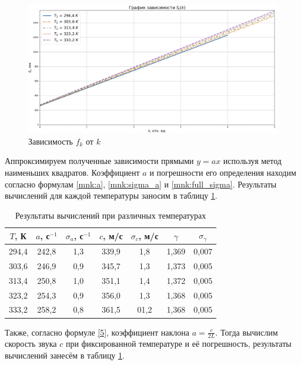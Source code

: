 \documentclass[a4paper,12pt]{article}
\theoremstyle{definition}
\begin{document}
	\begin{figure}[h!]
		\centering
		\includegraphics[scale=0.542]{graph2}
		\caption{Зависимость $ f_k $ от $ k $}
		\label{graph}
	\end{figure}

	Аппроксимируем полученные зависимости прямыми $ y=ax $ используя метод наименьших квадратов. Коэффициент $ a $ и погрешности его определения находим согласно формулам \eqref{mnk:a}, \eqref{mnk:sigma_a} и \eqref{mnk:full_sigma}. Результаты вычислений для каждой температуры заносим в таблицу \ref{tab:resConstL}.
	
	\begin{table}[H]
		\centering
		\begin{tabular}{|c|c|c|c|c|c|c|}
			\hline
			$ T $, К & $ a $, с$ ^{-1} $ & $ \sigma_a $, с$ ^{-1} $ & $ c $, м/с & $ \sigma_c $, м/с & $ \gamma $ & $ \sigma_\gamma $ \\ \hline
			294,4 & 242,8 & 1,3 & 339,9 & 1,8 & 1,369 & 0,007 \\ \hline
			303,6 & 246,9 & 0,9 & 345,7 & 1,3 & 1,373 & 0,005 \\ \hline
			313,4 & 250,8 & 1,0 & 351,1 & 1,4 & 1,372 & 0,005 \\ \hline
			323,2 & 254,3 & 0,9 & 356,0 & 1,3 & 1,368 & 0,005 \\ \hline
			333,2 & 258,2 & 0,8 & 361,5 & 01,2 & 1,368 & 0,005 \\ \hline
		\end{tabular}
		\caption{Результаты вычислений при различных температурах}
		\label{tab:resConstL}
	\end{table}
	
	Также, согласно формуле \eqref{5}, коэффициент наклона $ \displaystyle a = \frac{c}{2L}$. Тогда вычислим скорость звука $ c $ при фиксированной температуре и её погрешность, результаты вычислений занесём в таблицу \ref{tab:resConstL}.
	
\end{document}
